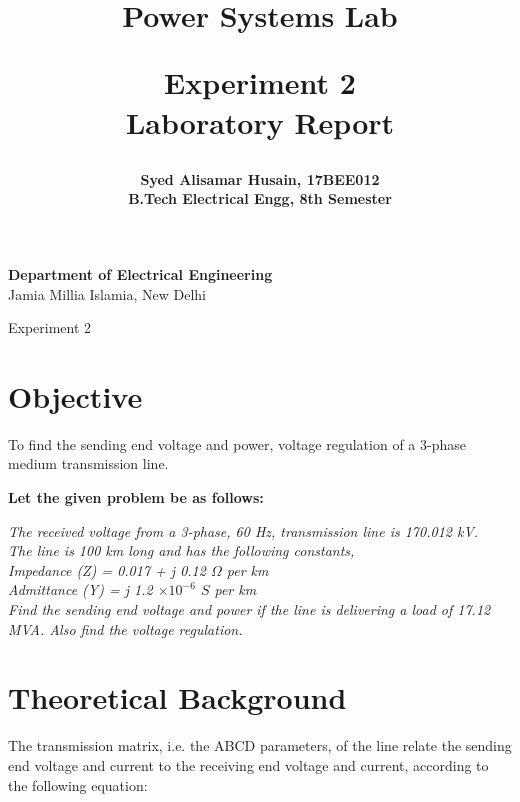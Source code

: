 \documentclass[a4paper,12pt]{article}
\title{
  {\Huge \bf Power Systems Lab}\\
  \vspace{0.25in}

  {\bf Experiment 2}\\
  Laboratory Report
  \vspace{1in}
}
\author{
  \bf Syed Alisamar Husain, 17BEE012\\
  B.Tech Electrical Engg, 8th Semester
}
\begin{document}
  \begin{titlepage}
    \maketitle
    \vspace*{\fill}
    \begin{center}
      {\bfseries Department of Electrical Engineering} \\
      Jamia Millia Islamia, New Delhi
    \end{center}
    \thispagestyle{empty}
  \end{titlepage}
  
  \newpage
  \begin{center}
    \huge Experiment 2
    \vspace{0.5in}
  \end{center}

  \section{Objective}
  To find the sending end voltage and power, 
  voltage regulation of a 3-phase medium transmission line.

  {\bf Let the given problem be as follows:}
  \begin{center}
    \itshape
    The received voltage from a 3-phase, 60 Hz, transmission line is 170.012 kV.\\
    The line is 100 km long and has the following constants,\\
    Impedance (Z) =  0.017 + j 0.12 $\Omega$ per km\\
    Admittance (Y) = j 1.2 $\times 10^{-6}$ $S$ per km\\
    Find the sending end voltage and power if the line is delivering a load of 17.12 MVA. 
    Also find the voltage regulation.
  \end{center}

  \section{Theoretical Background}
  The transmission matrix, i.e. the ABCD parameters, of the line relate the
  sending end voltage and current to the receiving end voltage and current, according
  to the following equation:
\end{document}
